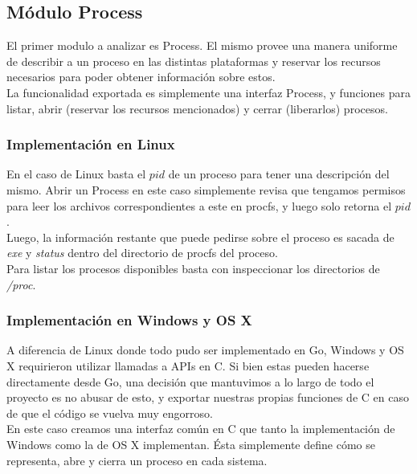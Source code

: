 \subsection{Módulo Process}

El primer modulo a analizar es Process. El mismo provee una manera
uniforme de describir a un proceso en las distintas plataformas y reservar los
recursos necesarios para poder obtener información sobre estos.\\

La funcionalidad exportada es simplemente una interfaz Process, y funciones
para listar, abrir (reservar los recursos mencionados) y cerrar (liberarlos)
procesos.\\

\subsubsection{Implementación en Linux}

En el caso de Linux basta el $pid$ de un proceso para tener una descripción del
mismo. Abrir un Process en este caso simplemente revisa que tengamos permisos
para leer los archivos correspondientes a este en procfs, y luego solo retorna
el $pid$.\\

Luego, la información restante que puede pedirse sobre el proceso es sacada de
\textit{exe} y \textit{status} dentro del directorio de procfs del proceso.\\

Para listar los procesos disponibles basta con inspeccionar los directorios de
\textit{/proc}.

\subsubsection{Implementación en Windows y OS X}

A diferencia de Linux donde todo pudo ser implementado en Go, Windows y OS X
requirieron utilizar llamadas a APIs en C. Si bien estas pueden hacerse
directamente desde Go, una decisión que mantuvimos a lo largo de todo el
proyecto es no abusar de esto, y exportar nuestras propias funciones de C en
caso de que el código se vuelva muy engorroso.\\

En este caso creamos una interfaz común en C que tanto la implementación de
Windows como la de OS X implementan. Ésta simplemente define cómo se representa,
abre y cierra un proceso en cada sistema.\\

